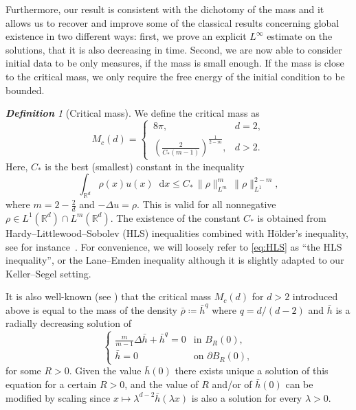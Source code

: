 \documentclass[11pt,a4paper]{article}
\numberwithin{equation}{section}
\newcommand{\R}{{\mathbb{R}}}
\theoremstyle{plain}
\theoremstyle{remark}
\newtheorem{definition}[theorem]{\bf Definition}
\newcommand {\f}{\frac}
\newcommand{\diff}{\mathop{}\!\mathrm{d}}
\begin{document}
\fi






Furthermore, our result is consistent with the dichotomy of the mass and it allows us to recover and improve some of the classical results concerning global existence in two different ways: first, we prove an explicit $L^{\infty}$ estimate on the solutions, that it is also decreasing in time. Second, we are now able to consider initial data to be only measures, if the mass is small enough. If the mass is close to the critical mass, we only require the free energy of the initial condition to be bounded.  





\begin{definition}[Critical mass]\label{def:critical_mass}
We define the critical mass as
\begin{equation}\label{def:Mc}
M_{c}(d)  = 
\begin{cases}
\displaystyle\,8\pi, & d=2,\\[3pt]
\displaystyle\,\left(\frac{2}{C_{*}(m-1)}\right)^{\frac{1}{2-m}}, & d>2.
\end{cases}
\end{equation}
Here,  $C_{*}$ is the best (smallest) constant in the inequality
\begin{equation}\label{eq:HLS}
\int_{\R^d}\rho(x) u(x)\diff x   \le   C_{*}\,\|\rho\|_{L^m}^{m} \,\|\rho\|_{L^1}^{2-m},
\end{equation}
where $m = 2 - \frac2d$ and $-\Delta u =\rho$. This is valid for all nonnegative $\rho\in L^{1}(\R^d)\cap L^{m}(\R^d)$. The existence of the constant $C_*$ is obtained from Hardy--Littlewood--Sobolev (HLS) inequalities combined with H\"older’s inequality, see for instance~\cite{Blanchet_Carrillo_Laurencot09, Calvez_Carrillo_Hoffmann17}. For convenience, we will loosely refer to \eqref{eq:HLS} as “the HLS inequality”, or the Lane--Emden inequality although it is slightly adapted to our Keller--Segel setting.

It is also well-known (see \cite[Proposition 3.5]{Blanchet_Carrillo_Laurencot09})  that the critical mass $M_c(d)$ for $d>2$ introduced above is equal to the mass of the density $\bar\rho \coloneqq \bar h^q$ where $q=d/(d-2)$ and $\bar h$ is a radially decreasing solution of %
$$
\begin{cases}
    \f{m}{m-1}\Delta \bar{h} + \bar{h}^q = 0 &\text{in } B_R(0),\\
    \bar h = 0 &\text{on } \partial B_R(0),
\end{cases}
$$
for some $R>0$. Given the value $\bar h(0)$ there exists unique a solution of this equation for a certain $R>0$, and the value of $R$ and/or of $\bar h(0)$ can be modified by scaling since $x\mapsto \lambda^{d-2}\bar h(\lambda x)$ is also a solution for every $\lambda>0$. 
\end{definition}
\end{document}
